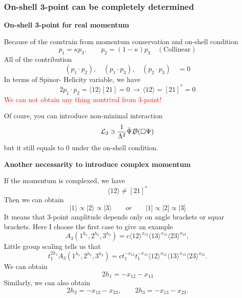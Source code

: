 \documentclass{beamer}
\newcommand{\aket}[1]{|#1\rangle}
\newcommand{\sket}[1]{|#1]}
\newcommand{\avg}[1]{\langle #1 \rangle}
\begin{document}
\begin{frame}
    \frametitle{ On-shell 3-point can be completely determined}
    \textbf{On-shell 3-point for real momentum}

    Because of the constrain from momentum conservation and on-shell condition
    \begin{equation*}
        p_1=\kappa p_3, \qquad p_2=(1-\kappa)p_3 \quad(\text{Collinear})
    \end{equation*}
    All of the contribution 
    \begin{equation*}
        (p_1\cdot p_2),\quad (p_1\cdot p_3),\quad(p_2\cdot p_3)\quad =0  
    \end{equation*}
    In terms of Spinor- Helicity variable, we have 
    \begin{equation*}
        2p_1\cdot p_2=\avg{12}[21]=0\, \longrightarrow \,\avg{12}=[21]^*=0
    \end{equation*}
    \textcolor{red}{We can not obtain any thing nontrival from 3-point!}
    
    Of coure, you can introduce non-minimal interaction
    \begin{equation*}
        \mathcal{L}_3 \ni \frac{1}{\Lambda^2}\bar{\Psi}\slashed{D}(\Box \Psi)
    \end{equation*}
    but it still equals to 0 under the on-shell condition.
\end{frame}

\begin{frame}
    \textbf{Another necessarity to introduce complex momentum}

    If the momentum is complexed, we have 
    \begin{equation*}
        \avg{12}\neq[21]^*
    \end{equation*}
    Then we can obtain
    \begin{equation*}
        \aket{1}\propto \aket{2}\propto \aket{3} \qquad or \qquad \sket{1}\propto \sket{2}\propto \sket{3}
    \end{equation*}
    It means that 3-point amplitude depends only on angle brackets or squar brackets. Here I choose the first case to give an example
    \begin{equation*}
        A_3(1^{h_1},2^{h_2},3^{h_3})=c\avg{12}^{x_{12}}\avg{13}^{x_{13}}\avg{23}^{x_{23}},
    \end{equation*}
    Little group scaling tells us that
    \begin{equation*}
        t_1^{2h_1} A_3(1^{h_1},2^{h_2},3^{h_3})=ct_1^{-x_{12}}t_1^{-x_{13}}\avg{12}^{x_{12}}\avg{13}^{x_{13}}\avg{23}^{x_{23}}.
    \end{equation*}
    We can obtain
    \begin{equation*}
        2h_1=-x_{12}-x_{13}
    \end{equation*}
    Similarly, we can also obtain
    \begin{equation*}
        2h_2=-x_{12}-x_{23},\qquad 2h_3=-x_{13}-x_{23}.
    \end{equation*}
\end{frame}
\end{document}
